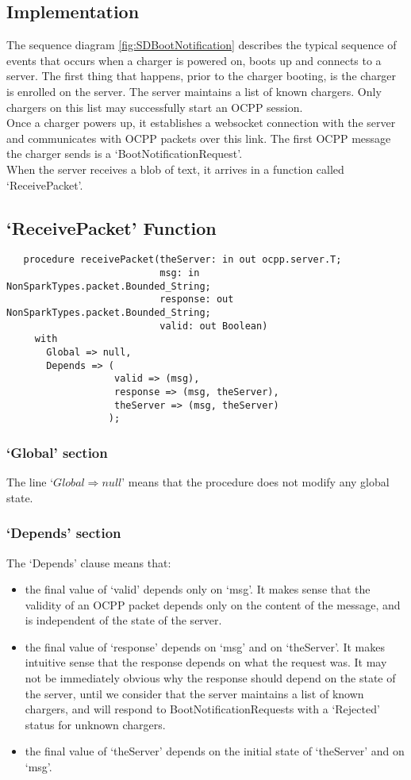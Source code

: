 \documentclass[12pt,openany,a4paper]{book}
\begin{document}
\subsection{Implementation}
The sequence diagram \ref{fig:SDBootNotification} describes the typical sequence of events that occurs when a charger is powered on, boots up and connects to a server. The first thing that happens, prior to the charger booting, is the charger is enrolled on the server. The server maintains a list of known chargers. Only chargers on this list may successfully start an OCPP session.\\
Once a charger powers up, it establishes a websocket connection with the server and communicates with OCPP packets over this link. The first OCPP message the charger sends is a `BootNotificationRequest'.\\
When the server receives a blob of text, it arrives in a function called `ReceivePacket'.

\subsection{`ReceivePacket' Function}

\begin{verbatim}
   procedure receivePacket(theServer: in out ocpp.server.T;
                           msg: in NonSparkTypes.packet.Bounded_String;
                           response: out NonSparkTypes.packet.Bounded_String;
                           valid: out Boolean)
     with
       Global => null,
       Depends => (
                   valid => (msg),
                   response => (msg, theServer),
                   theServer => (msg, theServer)
                  );
\end{verbatim}

\subsubsection{`Global' section}
The line `$Global \Rightarrow null$' means that the procedure does not modify any global state.
\subsubsection{`Depends' section}
The `Depends' clause means that:
\begin{itemize}
\item the final value of `valid' depends only on `msg'. It makes sense that the validity of an OCPP packet depends only on the content of the message, and is independent of the state of the server.
\item the final value of `response' depends on `msg' and on `theServer'. It makes intuitive sense that the response depends on what the request was. It may not be immediately obvious why the response should depend on the state of the server, until we consider that the server maintains a list of known chargers, and will respond to BootNotificationRequests with a `Rejected' status for unknown chargers.
\item the final value of `theServer' depends on the initial state of `theServer' and on `msg'. 
\end{itemize}
\end{document}

